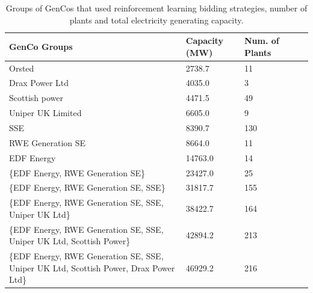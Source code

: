 \begin{table}
	\footnotesize
	\renewcommand{\arraystretch}{1.25}
	\centering
	\begin{tabular}{llllp{1.5cm}}
		\toprule
		GenCo Groups                                                                                                                  & Capacity (MW) & Num. of Plants \\ \midrule
		Orsted                                                                                                                       & 2738.7   & 11               \\
		Drax Power Ltd                                                                                                               & 4035.0   & 3                \\
		Scottish power                                                                                                               & 4471.5   & 49               \\
		Uniper UK Limited                                                                                                            & 6605.0   & 9                \\
		SSE                                                                                                                          & 8390.7   & 130              \\
		RWE Generation SE                                                                                                            & 8664.0   & 11               \\
		EDF Energy                                                                                                                   & 14763.0  & 14               \\
		\{EDF Energy, RWE Generation SE\}                                                                                              & 23427.0  & 25               \\
		\{EDF Energy, RWE Generation SE, SSE\}                                          & 31817.7  & 155              \\
		\{EDF Energy, RWE Generation SE, SSE, Uniper UK Ltd\}                              & 38422.7  & 164              \\
		\{EDF Energy, RWE Generation SE, SSE, Uniper UK Ltd, Scottish Power\}              & 42894.2  & 213              \\
		\{EDF Energy, RWE Generation SE, SSE, Uniper UK Ltd, Scottish Power, Drax Power Ltd\} & 46929.2  & 216              \\ 
		\bottomrule
	\end{tabular}
	\caption{Groups of GenCos that used reinforcement learning bidding strategies, number of plants and total electricity generating capacity.}
	\label{table:genco_table}
\end{table}


